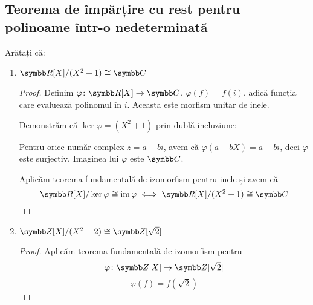 \subsection{Teorema de împărțire cu rest pentru polinoame într-o nedeterminată}

\begin{exercise}[2.5]
Arătați că:
\begin{enumerate}
    \item \(\reals[X] / (X^2 + 1) \cong \complex\)
    \begin{proof}
    Definim \(\varphi \colon \reals[X] \to \complex\), \(\varphi(f) = f(i)\), adică funcția care evaluează polinomul în \(i\).
    Aceasta este morfism unitar de inele.
    
    Demonstrăm că \(\ker \varphi = (X^2 + 1)\) prin dublă incluziune:
    
    Pentru orice număr complex \(z = a + bi\), avem că \(\varphi(a + bX) = a + bi\), deci \(\varphi\) este surjectiv.
    Imaginea lui \(\varphi\) este \(\complex\). 
    
    Aplicăm teorema fundamentală de izomorfism pentru inele și avem că
    \[
        \reals[X] / \ker \varphi \cong \operatorname{im} \varphi \iff \reals[X] / (X^2 + 1) \cong \complex
    \]
    \end{proof}
    
    \item \(\integers[X] / (X^2 - 2) \cong \integers[\sqrt{2}]\)
    \begin{proof}
    Aplicăm teorema fundamentală de izomorfism pentru
    \[
    \varphi \colon \integers[X] \to \integers[\sqrt{2}]
    \]
    \[
    \varphi(f) = f(\sqrt{2})
    \]
    \end{proof}
\end{enumerate}
\end{exercise}

